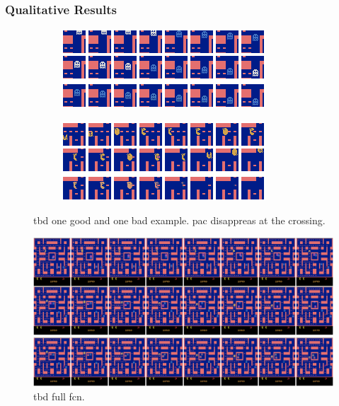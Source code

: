 \subsubsection{Qualitative Results}


\begin{figure}[h!tb]
\centering
\begin{subfigure}{0.49\textwidth}
  \centering
  \includegraphics[width=0.92\linewidth]{figures/pred/pac/random/pred-00.png}
  \caption{}
  \label{fig:pac-pred-random1}
\end{subfigure}%
\begin{subfigure}{0.49\textwidth}
  \centering
  \includegraphics[width=0.92\linewidth]{figures/pred/pac/random/pred-04.png}
  \caption{}
  \label{fig:pac-pred-random2}
\end{subfigure}
\caption[TBD]{tbd one good and one bad example. pac disappreas at the crossing.} \label{fig:pac-pred-random}
\end{figure}





\begin{figure}[htpb]
	\centering
	\includegraphics[width=1.0\linewidth]{figures/pred/pac/full/pred-00.png} 
	\caption[TBD]{tbd full fcn.} \label{fig:pac-pred-full1}
\end{figure}

